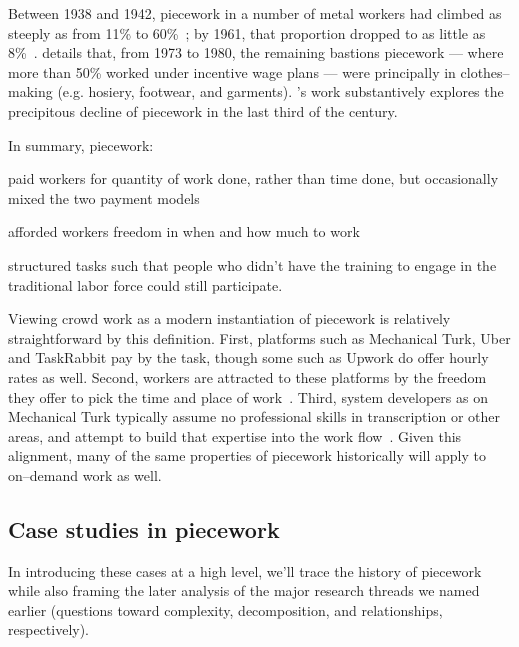 \documentclass[trackingWork]{subfiles}
\begin{document}
Between 1938 and 1942, piecework in a number of metal workers had climbed as steeply as from 11\% to 60\%~\cite{hart2005piecework};
by 1961, that proportion dropped to as little as 8\%~\cite{carlson1982time}.
\citeauthor{carlson1982time} details that, from 1973 to 1980, the remaining bastions piecework
--- where more than 50\% worked under incentive wage plans ---
were principally in clothes--making (e.g. hosiery, footwear, and garments).
\citeauthor{hart2013rise}'s work substantively explores the precipitous decline of piecework in the last third of the  century.



In summary, piecework:
\begin{inlinelist}
  \item paid workers for quantity of work done, rather than time done,
        but occasionally mixed the two payment models
  \item afforded workers freedom in when and how much to work
  \item structured tasks such that people who didn't have the training
        to engage in the traditional labor force could still participate.
\end{inlinelist}

Viewing crowd work as a modern instantiation of piecework is relatively straightforward by this definition.
First, platforms such as Mechanical Turk, Uber and TaskRabbit pay by the task, though some such as Upwork do offer hourly rates as well.
Second, workers are attracted to these platforms by the freedom they offer to pick the time and place of work~\cite{martin2014being,whyWouldAnyoneBrewer}.
Third, system developers as on Mechanical Turk typically assume no professional skills in transcription or other areas, and attempt to build that expertise into the work flow~\cite{noronha2011platemate,bernsteinSoylent}.
Given this alignment, many of the same properties of piecework historically will apply to on--demand work as well. 





\subsection{Case studies in piecework}
In introducing these cases at a high level,
we'll trace the history of piecework
while also framing the later analysis of the major research threads we named earlier
(questions toward complexity, decomposition, and relationships, respectively).
\end{document}
